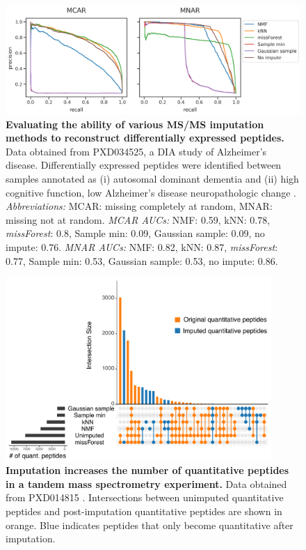 \documentclass{article}
\begin{document}
\begin{figure}
\centering
\includegraphics[width=1.0\textwidth]{figures/DE-experiment-multipanel0.png}
\caption{{\bf Evaluating the ability of various MS/MS imputation methods to reconstruct differentially expressed peptides.} Data obtained from PXD034525, a DIA study of Alzheimer's disease. Differentially expressed peptides were identified between samples annotated as (i) autosomal dominant dementia and (ii) high cognitive function, low Alzheimer's disease neuropathologic change \cite{smtg-maccoss}. \textit{Abbreviations:} MCAR: missing completely at random, MNAR: missing not at random. \textit{MCAR AUCs:} NMF: 0.59, kNN: 0.78, \textit{missForest}: 0.8, Sample min: 0.09, Gaussian sample: 0.09, no impute: 0.76. \textit{MNAR AUCs:} NMF: 0.82, kNN: 0.87, \textit{missForest}: 0.77, Sample min: 0.53, Gaussian sample: 0.53, no impute: 0.86.}
\label{fig:PR-curves}
\end{figure}

\begin{figure}
\centering
\includegraphics[width=0.9\textwidth]{figures/upset-plot-tab10.pdf}
\caption{{\bf Imputation increases the number of quantitative peptides in a tandem mass spectrometry experiment.} Data obtained from PXD014815 \cite{matrix-matched-calib}. Intersections between unimputed quantitative peptides and post-imputation quantitative peptides are shown in orange. Blue indicates peptides that only become quantitative after imputation.}
\label{fig:rescue-experiment}
\end{figure}
\end{document}
